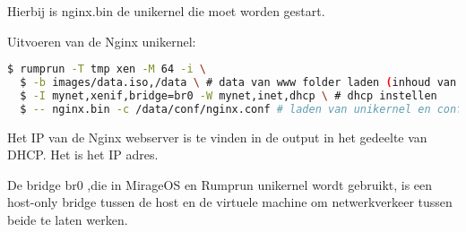 Hierbij is nginx.bin de unikernel die moet worden gestart.

\noindent Uitvoeren van de Nginx unikernel:
\begin{lstlisting}[language=bash]
  $ rumprun -T tmp xen -M 64 -i \
  $ -b images/data.iso,/data \ # data van www folder laden (inhoud van statische website)
  $ -I mynet,xenif,bridge=br0 -W mynet,inet,dhcp \ # dhcp instellen
  $ -- nginx.bin -c /data/conf/nginx.conf # laden van unikernel en configuratie
\end{lstlisting}

Het IP van de Nginx webserver is te vinden in de output in het gedeelte van DHCP. Het is het IP adres.

De bridge br0 ,die in MirageOS en Rumprun unikernel wordt gebruikt, is een host-only bridge tussen de host en de virtuele machine om netwerkverkeer tussen beide te laten werken.